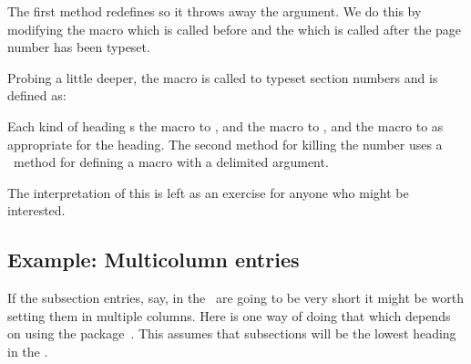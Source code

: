     The first method redefines \cmd{\numberline} so it throws away the
argument. We do this by modifying the \cmd{\cftKfont} macro which is called
before \cmd{\numberline} and the \cmd{\cftKafterpnum} which is called after
the page number has been typeset.
\begin{lcode}
\let\oldcftsf\cftsectionfont%
\let\oldcftspn\cftsectionafterpnum%
\renewcommand*{\cftsectionfont}{%
  \let\oldnl\numberline%
  \renewcommand*{\numberline}[1]{}%
  \oldcftsf}                 %
\renewcommand*{\cftsectionafterpnum}{%
  \let\numberline\oldnl%
  \oldcftspn}                %
\end{lcode}

    Probing a little deeper, the \cmd{\numberline} macro is called to
typeset section numbers and is defined as:
\begin{lcode}
\renewcommand*{\numberline}[1]{%
  \hb@xt@\@tempdima{\@cftbsnum #1\@cftasnum\hfil}\@cftasnumb}
\end{lcode}
Each
kind of heading \cmd{\let}s the \cmd{\@cftbsnum} macro to \cmd{\cftKpresnum},
and the \cmd{\@cftasnum} macro to \cmd{\cftKaftersnum}, and the
\cmd{\@cftasnumb} macro to \cmd{\cftKaftersnumb} as appropriate for the
heading. The second method for killing the number uses a \tx\ method 
for defining a macro with
a delimited argument.
\begin{lcode}
\def\cftsectionpresnum #1\@cftasnum{}
\end{lcode}
The interpretation of this is left as an exercise for anyone who might 
be interested.

\subsection{Example: Multicolumn entries}

    If the subsection entries, say, in the \toc\ are going to be very 
short it might be worth setting them in multiple columns. Here is one way
of doing that which depends on using the 
package~\cite{MULTICOL}. This assumes that subsections will be the lowest
heading in the \toc.
\begin{lcode}
\setcounter{toccols}{3}
\newenvironment{mysection}[1]{%
  \section{#1}%
  \addtocontents{toc}{\protect\begin{multicols}{\value{toccols}}}}%
  {\addtocontents{toc}{\protect\end{multocols}}}
\end{lcode}

